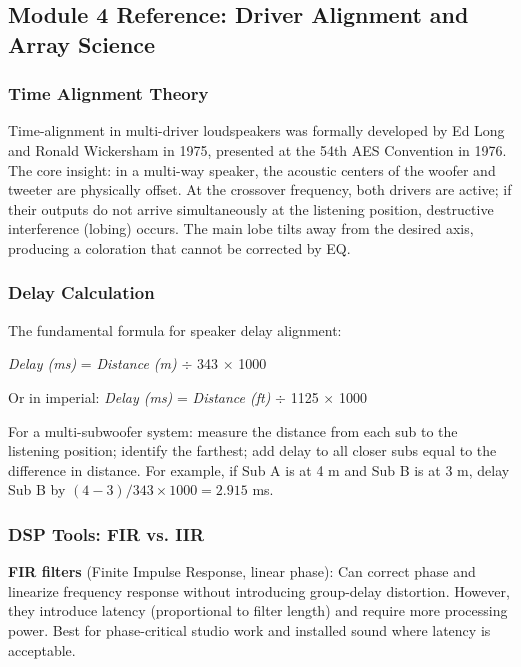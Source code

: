 \documentclass[11pt,letterpaper]{article}
\begin{document}
\subsection{Module 4 Reference: Driver Alignment and Array Science}

\subsubsection{Time Alignment Theory}

Time-alignment in multi-driver loudspeakers was formally developed by Ed Long and Ronald Wickersham in 1975, presented at the 54th AES Convention in 1976. The core insight: in a multi-way speaker, the acoustic centers of the woofer and tweeter are physically offset. At the crossover frequency, both drivers are active; if their outputs do not arrive simultaneously at the listening position, destructive interference (lobing) occurs. The main lobe tilts away from the desired axis, producing a coloration that cannot be corrected by EQ.

\subsubsection{Delay Calculation}

The fundamental formula for speaker delay alignment:

\begin{center}
\textit{Delay (ms)} = \textit{Distance (m)} $\div$ 343 $\times$ 1000
\end{center}

Or in imperial: \textit{Delay (ms)} = \textit{Distance (ft)} $\div$ 1125 $\times$ 1000

For a multi-subwoofer system: measure the distance from each sub to the listening position; identify the farthest; add delay to all closer subs equal to the difference in distance. For example, if Sub A is at 4 m and Sub B is at 3 m, delay Sub B by $(4-3)/343 \times 1000 = 2.915$ ms.

\subsubsection{DSP Tools: FIR vs. IIR}

\textbf{FIR filters} (Finite Impulse Response, linear phase): Can correct phase and linearize frequency response without introducing group-delay distortion. However, they introduce latency (proportional to filter length) and require more processing power. Best for phase-critical studio work and installed sound where latency is acceptable.
\end{document}
